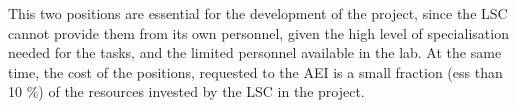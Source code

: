This two positions are essential for the development of the project, since the LSC cannot provide them from its own personnel, given the high level of specialisation needed for the tasks, and the limited personnel available in the lab. At the same time, the cost of the positions, requested to the AEI is a small fraction (ess than 10 \%) of the resources invested by the LSC in the project. 
  
